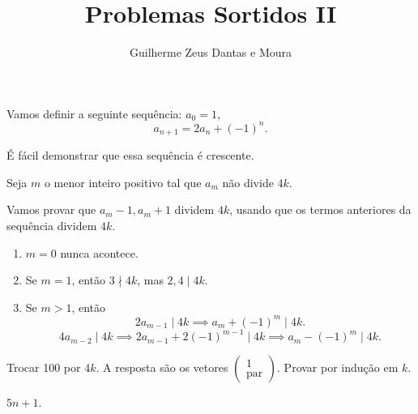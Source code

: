 \documentclass[10pt,a4paper]{article}
\title{Problemas Sortidos II}
\author{Guilherme Zeus Dantas e Moura}
\begin{document}
	
	\zeustitle
	

	\begin{sol}
		Vamos definir a seguinte sequência: $a_0 = 1$,  \[
			a_{n+1} = 2a_{n} + (-1)^n.
		\]

		É fácil demonstrar que essa sequência é crescente.

		Seja $m$ o menor inteiro positivo tal que $a_m$ não divide $4k$.

		Vamos provar que $a_m - 1, a_m + 1$ dividem $4k$, usando que os termos anteriores da sequência dividem $4k$.

		\begin{enumerate}[label = \textbullet]
			\item $m = 0$ nunca acontece.
			\item Se $m = 1$, então $3 \nmid 4k$, mas $2, 4\mid 4k$.
			\item Se $m > 1$, então 
				\[
					2a_{m-1} \mid 4k \implies a_m + (-1)^m \mid 4k.
				\]
				\[
					4a_{m-2} \mid 4k \implies 2a_{m-1} + 2(-1)^{m-1} \mid 4k \implies a_m - (-1)^m \mid 4k.
				\]
		\end{enumerate}
	\end{sol}

	\begin{sk}
		Trocar 100 por $4k$. A resposta são os vetores $
			\begin{pmatrix}
				1 \\\text{par}
			\end{pmatrix}
		$.
		Provar por indução em $k$.
	\end{sk}
	\begin{ans}
		$5n + 1$.
	\end{ans}
\end{document}

